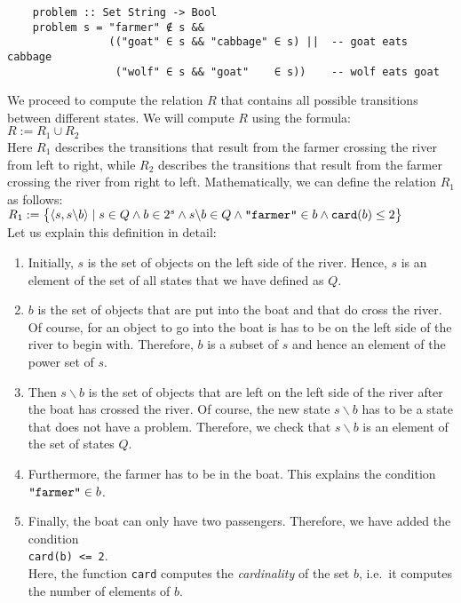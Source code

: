 \begin{verbatim}
    problem :: Set String -> Bool
    problem s = "farmer" ∉ s &&
                (("goat" ∈ s && "cabbage" ∈ s) ||  -- goat eats cabbage
                 ("wolf" ∈ s && "goat"    ∈ s))    -- wolf eats goat
\end{verbatim}
We proceed to compute the relation $R$ that contains all possible transitions between
different states.  We will compute $R$ using the formula:
\\[0.2cm]
\hspace*{1.3cm}
$R := R_1 \cup R_2$
\\[0.2cm]
Here $R_1$ describes the transitions that result from the farmer crossing the river from left
to right, while $R_2$ describes the transitions that result from the farmer crossing the river
from right to left.  Mathematically, we can define the relation $R_1$ as follows:
\\[0.2cm]
\hspace*{1.3cm}
$R_1 := \bigl\{ \langle s, s \backslash b \rangle \mid s \in Q \wedge b \in 2^s \wedge s \backslash b \in Q \wedge
                \squote{farmer} \in b \wedge \mathtt{card}(b) \leq 2 \bigr\}$
\\[0.2cm]
Let us explain this definition in detail:
\begin{enumerate}
\item Initially, $s$ is the set of objects on the left side of the river.  Hence, $s$
      is an element of the set of all states that we have defined as $Q$.
\item $b$ is the set of objects that are put into the boat and that do cross the river.  Of
      course, for an object to go into the boat is has to be on the left side of the river to begin
      with.  Therefore, $b$ is a subset of $s$ and hence an element of the power set
      of $s$. 
\item Then  $s \backslash b$ is the set of objects that are left on the left side of the river after
      the boat has crossed the river.  Of course, the new state $s \backslash b$ has to be a state that does not
      have a problem.  Therefore, we check that $s \backslash b$ is an element of the set of states $Q$.
\item Furthermore, the farmer has to be in the boat.  This explains the condition 
      \\[0.2cm]
      \hspace*{1.3cm}
      $\squote{farmer} \in b$.
\item Finally, the boat can only have two passengers.  Therefore, we have added the condition
      \\[0.2cm]
      \hspace*{1.3cm}
      \texttt{\texttt{card}(b) <= 2}.
      \\[0.2cm]
      Here, the function \texttt{card} computes the \emph{cardinality} of the set $b$, i.e.~it computes the
      number of elements of $b$.
\end{enumerate}
